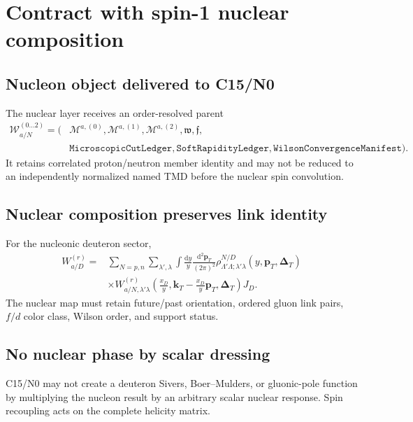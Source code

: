 \documentclass[11pt]{article}
\newcommand{\kT}{\bm{k}_{T}}
\newcommand{\pT}{\bm{p}_{T}}
\newcommand{\DT}{\bm{\Delta}_{T}}
\newcommand{\dd}{\mathrm{d}}
\newcommand{\cM}{\mathcal M}
\newcommand{\cW}{\mathcal W}
\newcommand{\CutLedger}{\texttt{MicroscopicCutLedger}}
\newcommand{\SoftLedger}{\texttt{SoftRapidityLedger}}
\newcommand{\ConvergenceManifest}{\texttt{WilsonConvergenceManifest}}
\begin{document}
\section{Contract with spin-1 nuclear composition}
\label{sec:nuclear-contract}

\subsection{Nucleon object delivered to C15/N0}

The nuclear layer receives an order-resolved parent
\begin{equation}
 \begin{aligned}
 \cW_{a/N}^{(0\ldots2)}=\bigl(&
 \cM^{a,(0)},\cM^{a,(1)},\cM^{a,(2)},\mathfrak w,\mathfrak f,
 \\
 &\CutLedger,\SoftLedger,\ConvergenceManifest\bigr).
 \end{aligned}
 \label{eq:nucleon-handoff}
\end{equation}
It retains correlated proton/neutron member identity and may not be reduced to
an independently normalized named TMD before the nuclear spin convolution.

\subsection{Nuclear composition preserves link identity}

For the nucleonic deuteron sector,
\begin{equation}
 \begin{aligned}
 W_{a/D}^{(r)}
 ={}&\sum_{N=p,n}\sum_{\lambda',\lambda}
 \int\frac{\dd y}{y}\frac{\dd^2\pT}{(2\pi)^2}
 \rho^{N/D}_{\Lambda'\Lambda;\lambda'\lambda}
 (y,\pT,\DT)
 \\
 &\times
 W_{a/N,\lambda'\lambda}^{(r)}
 \left(\frac{x_D}{y},
 \kT-\frac{x_D}{y}\pT,
 \DT\right)J_D.
 \end{aligned}
 \label{eq:nuclear-wilson-convolution}
\end{equation}
The nuclear map must retain future/past orientation, ordered gluon link pairs,
\(f/d\) color class, Wilson order, and support status.

\subsection{No nuclear phase by scalar dressing}

C15/N0 may not create a deuteron Sivers, Boer--Mulders, or gluonic-pole
function by multiplying the nucleon result by an arbitrary scalar nuclear
response.  Spin recoupling acts on the complete helicity matrix.
\end{document}

